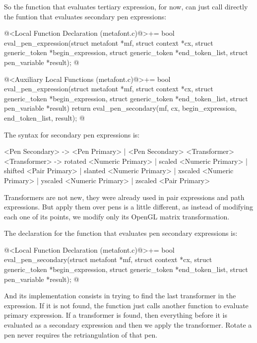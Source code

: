 So the function that evaluates tertiary expression, for now, can just
call directly the funtion that evaluates secondary pen expressions:

\iniciocodigo
@<Local Function Declaration (metafont.c)@>+=
bool eval_pen_expression(struct metafont *mf, struct context *cx,
                        struct generic_token *begin_expression,
                        struct generic_token *end_token_list,
                        struct pen_variable *result);
@
\fimcodigo

\iniciocodigo
@<Auxiliary Local Functions (metafont.c)@>+=
bool eval_pen_expression(struct metafont *mf, struct context *cx,
                        struct generic_token *begin_expression,
                        struct generic_token *end_token_list,
                        struct pen_variable *result){
  return eval_pen_secondary(mf, cx, begin_expression, end_token_list, result);
}
@
\fimcodigo


The syntax for secondary pen expressions is:

\alinhaverbatim
<Pen Secondary> -> <Pen Primary> | <Pen Secondary> <Transformer>
<Transformer> -> rotated <Numeric Primary> |
                 scaled <Numeric Primary> |
                 shifted <Pair Primary> |
                 slanted <Numeric Primary> |
                 xscaled <Numeric Primary> |
                 yscaled <Numeric Primary> |
                 zscaled <Pair Primary>
\alinhanormal

Transformers are not new, they were already used in pair expressions
and path expressions. But apply them over pens is a little different,
as instead of modifying each one of its points, we modify only its
OpenGL matrix transformation.

The declaration for the function that evaluates pen secondary
expressions is:

\iniciocodigo
@<Local Function Declaration (metafont.c)@>+=
bool eval_pen_secondary(struct metafont *mf, struct context *cx,
                        struct generic_token *begin_expression,
                        struct generic_token *end_token_list,
                        struct pen_variable *result);
@
\fimcodigo

And its implementation consists in trying to find the last transformer
in the expression. If it is not found, the function just calls another
function to evaluate primary expression. If a transformer is found,
then everything before it is evaluated as a secondary expression and
then we apply the transformer. Rotate a pen never requires the
retriangulation of that pen.

